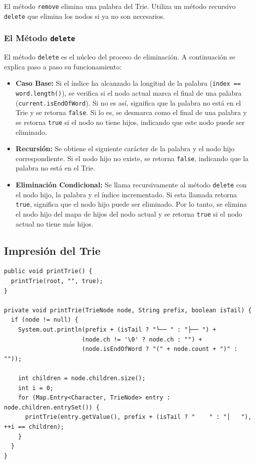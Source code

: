 \documentclass[11pt, a4paper]{article}
\begin{document}
El método \texttt{remove} elimina una palabra del Trie. Utiliza un método recursivo \texttt{delete} que elimina los nodos si ya no son necesarios. 

\subsubsection{El Método \texttt{delete}}
El método \texttt{delete} es el núcleo del proceso de eliminación. A continuación se explica paso a paso su funcionamiento:

\begin{itemize}
  \item \textbf{Caso Base:} Si el índice ha alcanzado la longitud de la palabra (\texttt{index == word.length()}), se verifica si el nodo actual marca el final de una palabra (\texttt{current.isEndOfWord}). Si no es así, significa que la palabra no está en el Trie y se retorna \texttt{false}. Si lo es, se desmarca como el final de una palabra y se retorna \texttt{true} si el nodo no tiene hijos, indicando que este nodo puede ser eliminado.
  \item \textbf{Recursión:} Se obtiene el siguiente carácter de la palabra y el nodo hijo correspondiente. Si el nodo hijo no existe, se retorna \texttt{false}, indicando que la palabra no está en el Trie.
  \item \textbf{Eliminación Condicional:} Se llama recursivamente al método \texttt{delete} con el nodo hijo, la palabra y el índice incrementado. Si esta llamada retorna \texttt{true}, significa que el nodo hijo puede ser eliminado. Por lo tanto, se elimina el nodo hijo del mapa de hijos del nodo actual y se retorna \texttt{true} si el nodo actual no tiene más hijos.
\end{itemize}

\subsection{Impresión del Trie}
\begin{verbatim}
public void printTrie() {
  printTrie(root, "", true);
}

private void printTrie(TrieNode node, String prefix, boolean isTail) {
  if (node != null) {
    System.out.println(prefix + (isTail ? "└── " : "├── ") +
                      (node.ch != '\0' ? node.ch : "") +
                      (node.isEndOfWord ? "(" + node.count + ")" : ""));

    int children = node.children.size();
    int i = 0;
    for (Map.Entry<Character, TrieNode> entry : node.children.entrySet()) {
      printTrie(entry.getValue(), prefix + (isTail ? "    " : "│   "), ++i == children);
    }
  }
}
\end{verbatim}
\end{document}
